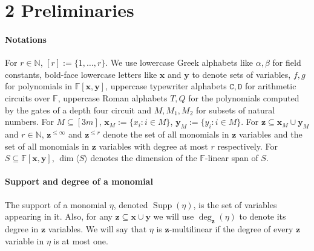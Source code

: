 \section*{2 Preliminaries}
\paragraph{Notations}
For $r\in\mathbb N$, $[r]:=\{1,\ldots,r\}$. We use lowercase Greek alphabets like $\alpha,\beta$ for field constants, bold-face lowercase letters like $\mathbf x$ and $\mathbf y$ to denote sets of variables, $f,g$ for polynomials in $\mathbb F[\mathbf x,\mathbf y]$, uppercase typewriter alphabets $\mathtt C,\mathtt D$ for arithmetic circuits over $\mathbb F$, uppercase Roman alphabets $T,Q$ for the polynomials computed by the gates of a depth four circuit and $M,M_1,M_2$ for subsets of natural numbers. For $M\subseteq[3m]$, $\mathbf x_M:=\{x_i:i\in M\}$, $\mathbf y_M:=\{y_i:i\in M\}$. For $\mathbf z\subseteq\mathbf x_M\cup\mathbf y_M$ and $r\in\mathbb N$, $\mathbf z^{\le\infty}$ and $\mathbf z^{\le r}$ denote the set of all monomials in $\mathbf z$ variables and the set of all monomials in $\mathbf z$ variables with degree at most $r$ respectively. For $S\subseteq\mathbb F[\mathbf x,\mathbf y]$, $\dim\langle S\rangle$ denotes the dimension of the $\mathbb F$-linear span of $S$.
\paragraph{Support and degree of a monomial}
The support of a monomial $\eta$, denoted $\operatorname{Supp}(\eta)$, is the set of variables appearing in it. Also, for any $\mathbf z\subseteq\mathbf x\cup\mathbf y$ we will use $\deg_{\mathbf z}(\eta)$ to denote its degree in $\mathbf z$ variables. We will say that $\eta$ is $\mathbf z$-multilinear if the degree of every $\mathbf z$ variable in $\eta$ is at most one.
